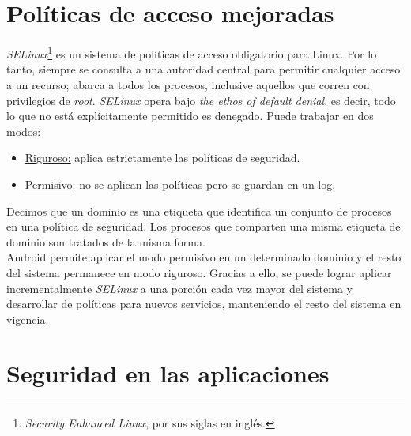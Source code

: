 \section{Políticas de acceso mejoradas}
\emph{SELinux}\footnote{\textit{Security Enhanced Linux}, por sus siglas en inglés.} es un sistema de políticas de acceso obligatorio para Linux. Por lo tanto, siempre se consulta a una autoridad central para permitir cualquier acceso a un recurso; abarca a todos los procesos, inclusive aquellos que corren con privilegios de \textit{root}. \emph{SELinux} opera bajo \textit{the ethos of default denial}, es decir, todo lo que no está explícitamente permitido es denegado. Puede trabajar en dos modos:
\begin{itemize}
    \item \underline{Riguroso:} aplica estrictamente las políticas de seguridad.
    \item \underline{Permisivo:} no se aplican las políticas pero se guardan en un log.
\end{itemize} 
Decimos que un dominio es una etiqueta que identifica un conjunto de procesos en una política de seguridad. Los procesos que comparten una misma etiqueta de dominio son tratados de la misma forma. \\
Android permite aplicar el modo permisivo en un determinado dominio y el resto del sistema permanece en modo riguroso. Gracias a ello, se puede lograr aplicar incrementalmente \emph{SELinux} a una porción cada vez mayor del sistema y desarrollar de políticas para nuevos servicios, manteniendo el resto del sistema en vigencia.
\section{Seguridad en las aplicaciones}
